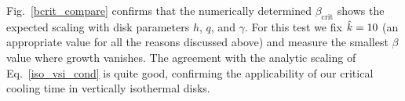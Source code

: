 Fig.\ \ref{bcrit_compare} confirms that the numerically determined
$\beta_\mathrm{crit}$ shows the expected scaling with disk parameters $h$, $q$, and $\gamma$.
For this test we fix $\hat{k} = 10$ (an appropriate value for all the reasons discussed above) and measure
the smallest $\beta$ value where growth vanishes.  The agreement with the analytic scaling of 
Eq.\ \ref{iso_vsi_cond} is quite good, confirming the applicability of our critical cooling time in
vertically isothermal disks.


%
%


